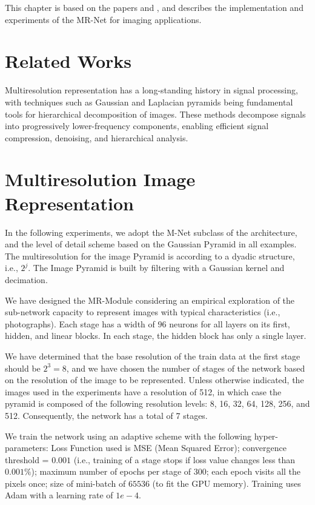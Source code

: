 This chapter is based on the papers \cite{paz2022} and \cite{paz2023mr}, and describes the implementation and experiments of the MR-Net for imaging applications. 

\section{Related Works}

Multiresolution representation has a long-standing history in signal processing, with techniques such as Gaussian and Laplacian pyramids \citep{burt1987laplacian} being fundamental tools for hierarchical decomposition of images. These methods decompose signals into progressively lower-frequency components, enabling efficient signal compression, denoising, and hierarchical analysis.


\section{Multiresolution Image Representation}
\label{s:img}


In the following experiments, we adopt the M-Net subclass of the architecture, and the level of detail scheme based on the Gaussian Pyramid in all examples. The multiresolution for the image Pyramid is according to a dyadic structure, i.e., $2^j$. The Image Pyramid is built by filtering with a Gaussian kernel and decimation.

We have designed the MR-Module considering an empirical exploration of the sub-network capacity to represent images with typical characteristics (i.e., photographs). Each stage has a width of $96$ neurons for all layers on its first, hidden, and linear blocks. In each stage, the hidden block has only a single layer.

We have determined that the base resolution of the train data at the first stage should be $2^3 = 8$, and we have chosen the number of stages of the network based on the resolution of the image to be represented. Unless otherwise indicated, the images used in the experiments have a resolution of 512, in which case the pyramid is composed of the following resolution levels: 8, 16, 32, 64, 128, 256, and 512. Consequently, the network has a total of 7 stages.

We train the network using an adaptive scheme with the following hyper-parameters: Loss Function used is MSE (Mean Squared Error); convergence threshold = $0.001$ (i.e., training of a stage stops if loss value changes less than $0.001\%$); maximum number of epochs per stage of $300$; each epoch visits all the pixels once; size of mini-batch of $65536$ (to fit the GPU memory). Training uses Adam with a learning rate of $1e-4$.

